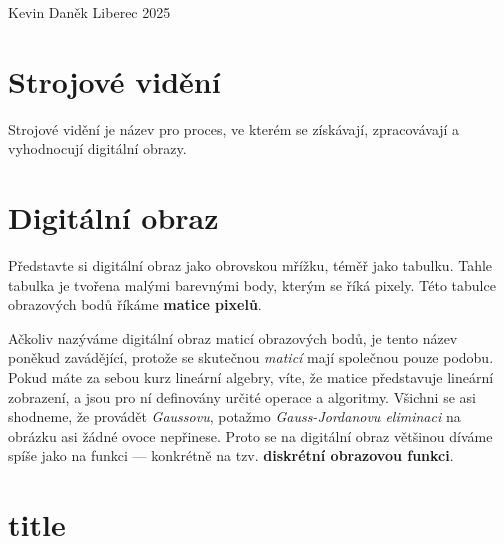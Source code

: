 \documentclass[a4paper,12pt,twoside,FM]{article}
\begin{document}
{Kevin Daněk}
{Liberec 2025}

\section{Strojové vidění}
Strojové vidění je název pro proces, ve kterém se získávají, zpracovávají a vyhodnocují digitální obrazy.

\section{Digitální obraz}
Představte si digitální obraz jako obrovskou mřížku, téměř jako tabulku. Tahle tabulka je tvořena malými barevnými body, kterým se říká pixely. Této tabulce obrazových bodů říkáme \textbf{matice pixelů}.

Ačkoliv nazýváme digitální obraz maticí obrazových bodů, je tento název poněkud zavádějící, protože se skutečnou \textit{maticí} mají společnou pouze podobu. Pokud máte za sebou kurz lineární algebry, víte, že matice představuje lineární zobrazení, a jsou pro ní definovány určité operace a algoritmy. Všichni se asi shodneme, že provádět \textit{Gaussovu}, potažmo \textit{Gauss-Jordanovu eliminaci} na obrázku asi žádné ovoce nepřinese. Proto se na digitální obraz většinou díváme spíše jako na funkci — konkrétně na tzv. \textbf{diskrétní obrazovou funkci}.



\section{title}
\end{document}

